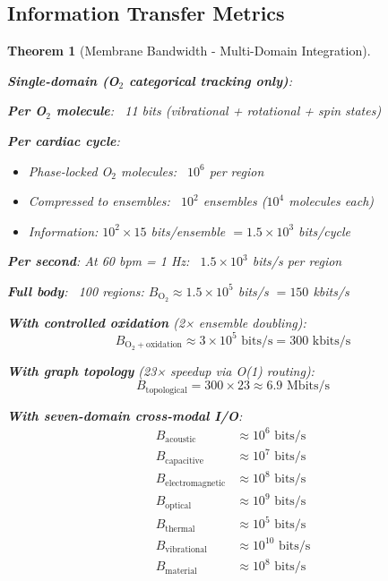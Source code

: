 \documentclass[11pt,a4paper]{article}
\newtheorem{theorem}{Theorem}[section]
\theoremstyle{definition}
\theoremstyle{remark}
\begin{document}
\subsection{Information Transfer Metrics}

\begin{theorem}[Membrane Bandwidth - Multi-Domain Integration]
\label{thm:membrane_bandwidth_complete}

\textbf{Single-domain (O$_2$ categorical tracking only)}:

\textbf{Per O$_2$ molecule}: ~11 bits (vibrational + rotational + spin states)

\textbf{Per cardiac cycle}: 
\begin{itemize}
\item Phase-locked O$_2$ molecules: ~$10^6$ per region
\item Compressed to ensembles: ~$10^2$ ensembles ($10^4$ molecules each)
\item Information: $10^2 \times 15$ bits/ensemble $= 1.5 \times 10^3$ bits/cycle
\end{itemize}

\textbf{Per second}: At 60 bpm = 1 Hz: ~$1.5 \times 10^3$ bits/s per region

\textbf{Full body}: ~100 regions: $B_{\text{O}_2} \approx 1.5 \times 10^5$ bits/s $= 150$ kbits/s

\textbf{With controlled oxidation} (2× ensemble doubling):
\begin{equation}
B_{\text{O}_2+\text{oxidation}} \approx 3 \times 10^5 \text{ bits/s} = 300 \text{ kbits/s}
\end{equation}

\textbf{With graph topology} (23× speedup via O(1) routing):
\begin{equation}
B_{\text{topological}} = 300 \times 23 \approx 6.9 \text{ Mbits/s}
\end{equation}

\textbf{With seven-domain cross-modal I/O}:
\begin{align}
B_{\text{acoustic}} &\approx 10^6 \text{ bits/s} \\
B_{\text{capacitive}} &\approx 10^7 \text{ bits/s} \\
B_{\text{electromagnetic}} &\approx 10^8 \text{ bits/s} \\
B_{\text{optical}} &\approx 10^9 \text{ bits/s} \\
B_{\text{thermal}} &\approx 10^5 \text{ bits/s} \\
B_{\text{vibrational}} &\approx 10^{10} \text{ bits/s} \\
B_{\text{material}} &\approx 10^8 \text{ bits/s}
\end{align}


\end{theorem}
\end{document}

